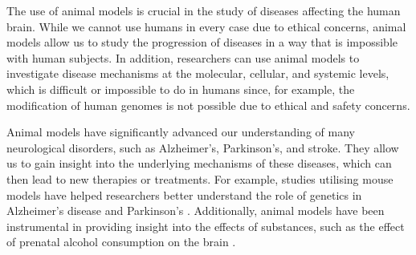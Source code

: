 \documentclass[10pt]{article}
\begin{document}
\begin{sloppypar}
  \vspace{10pt} %
  \begin{table}[ht]
    \centering
    \renewcommand{\arraystretch}{1.5}
    \setlength{\tabcolsep}{12pt}
    \caption{Overview of in vitro, in vivo, and in silico research methods.}
    \label{tab:overview-research-methods}
  \end{table}

  The use of animal models is crucial in the study of diseases affecting the human brain. While we cannot use humans in every case due to ethical concerns, animal models allow us to study the progression of diseases in a way that is impossible with human subjects. In addition, researchers can use animal models to investigate disease mechanisms at the molecular, cellular, and systemic levels, which is difficult or impossible to do in humans since, for example, the modification of human genomes is not possible due to ethical and safety concerns.

  Animal models have significantly advanced our understanding of many neurological disorders, such as Alzheimer’s, Parkinson’s, and stroke. They allow us to gain insight into the underlying mechanisms of these diseases, which can then lead to new therapies or treatments. For example, studies utilising mouse models have helped researchers better understand the role of genetics in Alzheimer’s disease \citep{holtzman_alzheimers_2011} and Parkinson’s \citep{hernandez_genetics_2016}. Additionally, animal models have been instrumental in providing insight into the effects of substances, such as the effect of prenatal alcohol consumption on the brain \citep{bisen_proteomic_2019}.


\end{sloppypar}
\end{document}

